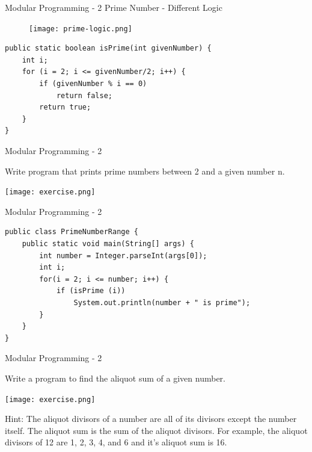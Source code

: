 \documentclass[14pt]{beamer}
\begin{document}
\begin{frame}[fragile]{Modular Programming - 2}
Prime Number - Different Logic
\begin{figure}[H]
\texttt{[image: prime-logic.png]}
\end{figure}
\begin{lstlisting}[numbers=none]
public static boolean isPrime(int givenNumber) {
    int i;
    for (i = 2; i <= givenNumber/2; i++) {
        if (givenNumber % i == 0) 
            return false;
        return true;
    }
}
\end{lstlisting}
\end{frame}

\begin{frame}[fragile]{Modular Programming - 2}
\begin{minipage}{7cm}
Write program that prints prime numbers between 2 and a given number n. 
\end{minipage}
\quad
\begin{minipage}{3cm}
\texttt{[image: exercise.png]}
\end{minipage}
\end{frame}

\begin{frame}[fragile]{Modular Programming - 2}
\begin{lstlisting}[numbers=none]
public class PrimeNumberRange {
    public static void main(String[] args) {
        int number = Integer.parseInt(args[0]);
        int i; 	
        for(i = 2; i <= number; i++) {	
            if (isPrime (i))
                System.out.println(number + " is prime");
        }
    }
}
\end{lstlisting}
\end{frame}

\begin{frame}[fragile]{Modular Programming - 2}
\begin{minipage}{7cm}
Write a program to find the aliquot sum of a given number.
\end{minipage}
\quad
\begin{minipage}{3cm}
\texttt{[image: exercise.png]}
\end{minipage}
\begin{block}{Hint:}
The aliquot divisors of a number are all of its divisors except the number itself. The aliquot sum is the sum of the aliquot divisors. For example, the aliquot divisors of 12 are 1, 2, 3, 4, and 6 and it's aliquot sum is 16.
\end{block}
\end{frame}
\end{document}
